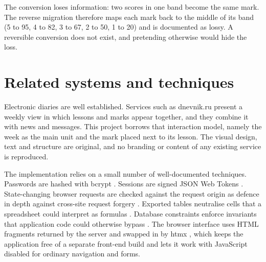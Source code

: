 The conversion loses information: two scores in one band become the same mark. The reverse migration therefore maps each mark back to the middle of its band (5 to 95, 4 to 82, 3 to 67, 2 to 50, 1 to 20) and is documented as lossy. A reversible conversion does not exist, and pretending otherwise would hide the loss.

\section{Related systems and techniques}

Electronic diaries are well established. Services such as dnevnik.ru present a weekly view in which lessons and marks appear together, and they combine it with news and messages. This project borrows that interaction model, namely the week as the main unit and the mark placed next to its lesson. The visual design, text and structure are original, and no branding or content of any existing service is reproduced.

The implementation relies on a small number of well-documented techniques. Passwords are hashed with bcrypt \cite{bcrypt}. Sessions are signed JSON Web Tokens \cite{jwt}. State-changing browser requests are checked against the request origin as defence in depth against cross-site request forgery \cite{owaspcsrf}. Exported tables neutralise cells that a spreadsheet could interpret as formulas \cite{owaspcsv}. Database constraints enforce invariants that application code could otherwise bypass \cite{pgconstraints}. The browser interface uses HTML fragments returned by the server and swapped in by htmx \cite{htmx}, which keeps the application free of a separate front-end build and lets it work with JavaScript disabled for ordinary navigation and forms.
